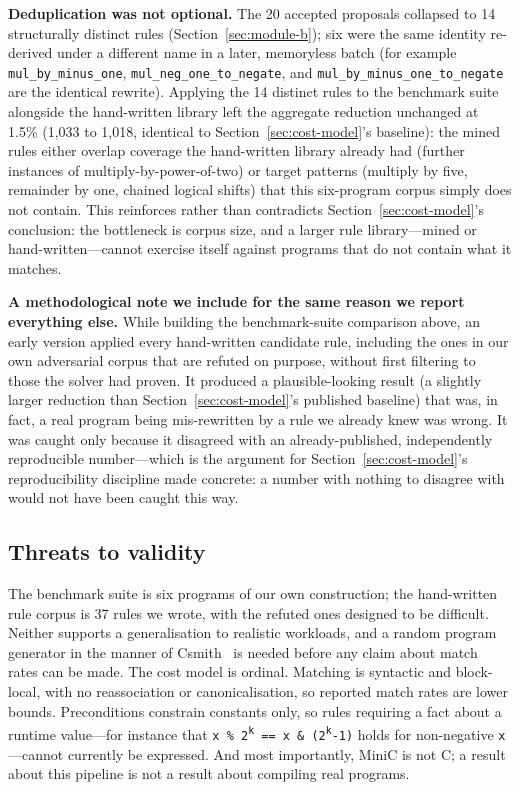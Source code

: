 \documentclass[conference]{IEEEtran}
\begin{document}
\textbf{Deduplication was not optional.} The 20 accepted proposals collapsed
to 14 structurally distinct rules (Section~\ref{sec:module-b}); six were the
same identity re-derived under a different name in a later, memoryless batch
(for example \texttt{mul\_by\_minus\_one}, \texttt{mul\_neg\_one\_to\_negate},
and \texttt{mul\_by\_minus\_one\_to\_negate} are the identical rewrite).
Applying the 14 distinct rules to the benchmark suite alongside the
hand-written library left the aggregate reduction unchanged at 1.5\% (1{,}033
to 1{,}018, identical to Section~\ref{sec:cost-model}'s baseline): the mined
rules either overlap coverage the hand-written library already had (further
instances of multiply-by-power-of-two) or target patterns (multiply by five,
remainder by one, chained logical shifts) that this six-program corpus simply
does not contain. This reinforces rather than contradicts
Section~\ref{sec:cost-model}'s conclusion: the bottleneck is corpus size, and
a larger rule library---mined or hand-written---cannot exercise itself against
programs that do not contain what it matches.

\textbf{A methodological note we include for the same reason we report
everything else.} While building the benchmark-suite comparison above, an
early version applied every hand-written candidate rule, including the ones
in our own adversarial corpus that are refuted on purpose, without first
filtering to those the solver had proven. It produced a plausible-looking
result (a slightly larger reduction than Section~\ref{sec:cost-model}'s
published baseline) that was, in fact, a real program being mis-rewritten by
a rule we already knew was wrong. It was caught only because it disagreed
with an already-published, independently reproducible number---which is the
argument for Section~\ref{sec:cost-model}'s reproducibility discipline made
concrete: a number with nothing to disagree with would not have been caught
this way.

\subsection{Threats to validity}

The benchmark suite is six programs of our own construction; the hand-written
rule corpus is 37 rules we wrote, with the refuted ones designed to be
difficult. Neither supports a generalisation to realistic workloads, and a
random program generator in the manner of Csmith~\cite{csmith} is needed
before any claim about match rates can be made. The cost model is ordinal.
Matching is syntactic and block-local, with no reassociation or
canonicalisation, so reported match rates are lower bounds. Preconditions
constrain constants only, so rules requiring a fact about a runtime value---for
instance that \texttt{x \% 2\textsuperscript{k} == x \& (2\textsuperscript{k}-1)}
holds for non-negative \texttt{x}---cannot currently be expressed. And most
importantly, MiniC is not C; a result about this pipeline is not a result about
compiling real programs.
\end{document}
